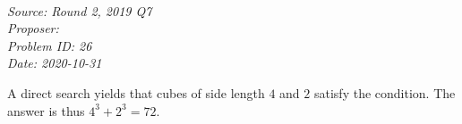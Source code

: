 \SSbreak\\
\emph{Source: \Cnzsmc Round 2, 2019 Q7}\\
\emph{Proposer: \Pbrain}\\
\emph{Problem ID: 26}\\
\emph{Date: 2020-10-31}\\
\SSbreak

\bigskip 

\begin{solution}\hfil\medskip 

    A direct search yields that cubes of side length $4$ and $2$ satisfy the condition. The answer is thus $4^3 + 2^3 = \boxed{72}$.
\end{solution}\bigskip